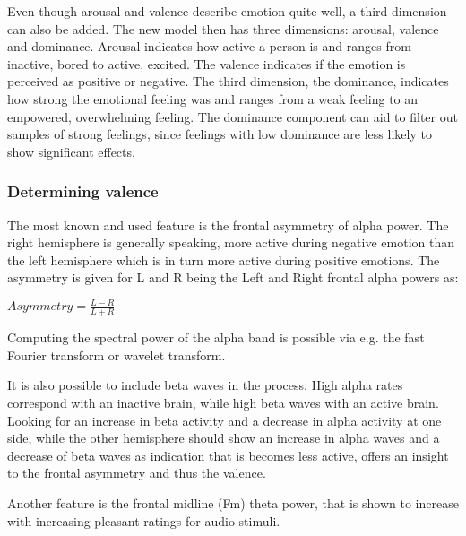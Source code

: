 \npar
Even though arousal and valence describe emotion quite well, a third dimension can also be added. The new model then has three dimensions: arousal, valence and dominance. Arousal indicates how active a person is and ranges from inactive, bored to active, excited. The valence indicates if the emotion is perceived as positive or negative. The third dimension, the dominance, indicates how strong the emotional feeling was and ranges from a weak feeling to an empowered, overwhelming feeling. The dominance component can aid to filter out samples of strong feelings, since feelings with low dominance are less likely to show significant effects.


\subsubsection{Determining valence}
\label{DetValence}

The most known and used feature is the frontal asymmetry of alpha power\cite{GivenPaper}.
The right hemisphere is generally speaking, more active during negative emotion than the left hemisphere which is in turn more active during positive emotions\cite{RealTimeEEGEmotion,EEGDatasets}. The asymmetry is given for L and R being the Left and Right frontal alpha powers as:\\
\begin{center}
$Asymmetry = \frac{L-R}{L+R}$
\end{center}
Computing the spectral power of the alpha band is possible via e.g. the fast Fourier transform or wavelet transform.

\npar

It is also possible to include beta waves in the process. High alpha rates correspond with an inactive brain, while high beta waves with an active brain. Looking for an increase in beta activity and a decrease in alpha activity at one side, while the other hemisphere should show an increase in alpha waves and a decrease of beta waves as indication that is becomes less active, offers an insight to the frontal asymmetry and thus the valence\cite{ExtendedPaper}. 

\npar

Another feature is the frontal midline (Fm) theta power, that is shown to increase with increasing pleasant ratings for audio stimuli\cite{MusicPaper}. %

